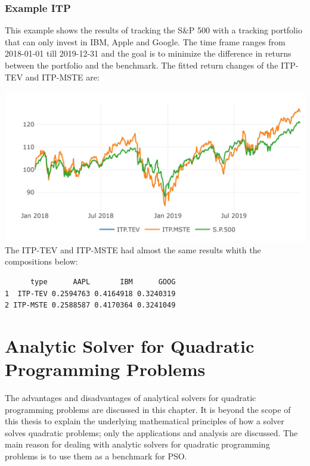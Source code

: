 \documentclass[
  oneside]{book}
\begin{document}
\hypertarget{example-itp}{%
\subsection{Example ITP}\label{example-itp}}

This example shows the results of tracking the S\&P 500 with a tracking portfolio that can only invest in IBM, Apple and Google. The time frame ranges from 2018-01-01 till 2019-12-31 and the goal is to minimize the difference in returns between the portfolio and the benchmark. The fitted return changes of the ITP-TEV and ITP-MSTE are:

\includegraphics{Master_Thesis_files/figure-latex/ITP_ex-1.png}
The ITP-TEV and ITP-MSTE had almost the same results whith the compositions below:

\begin{verbatim}
      type      AAPL       IBM      GOOG
1  ITP-TEV 0.2594763 0.4164918 0.3240319
2 ITP-MSTE 0.2588587 0.4170364 0.3241049
\end{verbatim}

\hypertarget{analytic-solver-for-quadratic-programming-problems}{%
\chapter{Analytic Solver for Quadratic Programming Problems}\label{analytic-solver-for-quadratic-programming-problems}}

The advantages and disadvantages of analytical solvers for quadratic programming problems are discussed in this chapter. It is beyond the scope of this thesis to explain the underlying mathematical principles of how a solver solves quadratic problems; only the applications and analysis are discussed. The main reason for dealing with analytic solvers for quadratic programming problems is to use them as a benchmark for PSO.
\end{document}

